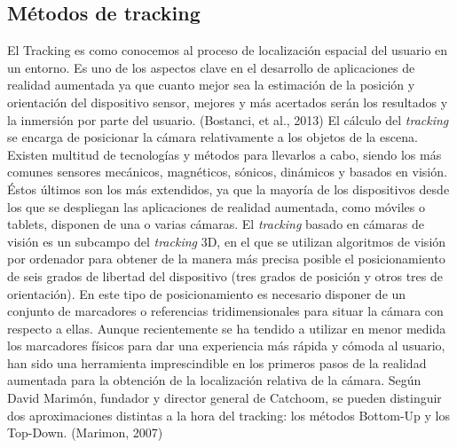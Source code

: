 \subsection{Métodos de tracking}
El Tracking es como conocemos al proceso de localización espacial del usuario en un entorno. Es uno de los aspectos clave en el desarrollo de aplicaciones de realidad aumentada ya que cuanto mejor sea la estimación de la posición y orientación del dispositivo sensor, mejores y más acertados serán los resultados y la inmersión por parte del usuario. (Bostanci, et al., 2013)
El cálculo del \textit{tracking} se encarga de posicionar la cámara relativamente a los objetos de la escena. Existen multitud de tecnologías y métodos para llevarlos a cabo, siendo los más comunes sensores mecánicos, magnéticos, sónicos, dinámicos y basados en visión. Éstos últimos son los más extendidos, ya que la mayoría de los dispositivos desde los que se despliegan las aplicaciones de realidad aumentada, como móviles o tablets, disponen de una o varias cámaras. \cite{ARToolkit}
El \textit{tracking} basado en cámaras de visión es un subcampo del \textit{tracking} 3D, en el que se utilizan algoritmos de visión por ordenador para obtener de la manera más precisa posible el posicionamiento de seis grados de libertad del dispositivo (tres grados de posición y otros tres de orientación).
En este tipo de posicionamiento es necesario disponer de un conjunto de marcadores o referencias tridimensionales para situar la cámara con respecto a ellas. Aunque recientemente se ha tendido a utilizar en menor medida los marcadores físicos para dar una experiencia más rápida y cómoda al usuario, han sido una herramienta imprescindible en los primeros pasos de la realidad aumentada para la obtención de la localización relativa de la cámara.
Según David Marimón, fundador y director general de Catchoom, se pueden distinguir dos aproximaciones distintas a la hora del tracking: los métodos Bottom-Up y los Top-Down. (Marimon, 2007)

